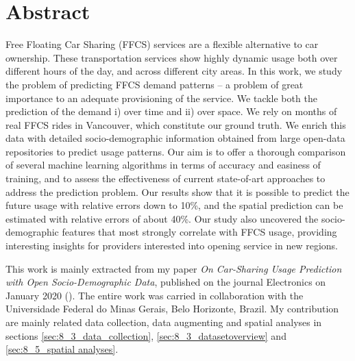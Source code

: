\section{Abstract}
Free Floating Car Sharing (FFCS) services are a flexible alternative to car ownership. These transportation services show highly dynamic usage both over different hours of the day, and across different city areas. 
In this work, we study the problem of predicting FFCS demand patterns -- a problem of great importance to an adequate provisioning of the service. We tackle both the prediction of the demand i) over time and ii) over space. 
We rely on months of real FFCS rides in Vancouver, which constitute our ground truth. We enrich this data with detailed socio-demographic information obtained from large open-data repositories to predict usage patterns. 
Our aim is to offer a thorough comparison of several machine learning algorithms in terms of accuracy and easiness of training, and to assess the effectiveness of current state-of-art approaches to address the prediction problem.
Our results show that it is possible to predict the future usage with relative errors down to 10\%, and the spatial prediction can be estimated with relative errors of about 40\%.
Our study also uncovered the socio-demographic features that most strongly correlate with FFCS usage, providing interesting insights for providers interested into opening service in new regions.

This work is mainly extracted from my paper \textit{On Car-Sharing Usage Prediction with Open Socio-Demographic Data}, published on the journal Electronics on January 2020 (\cite{cocca2020predictions}). The entire work was carried in collaboration with the Universidade Federal do Minas Gerais, Belo Horizonte, Brazil. My contribution are mainly related data collection, data augmenting and spatial analyses in sections \ref{sec:8_3_data_collection}, \ref{sec:8_3_datasetoverview} and \ref{sec:8_5_spatial analyses}.




